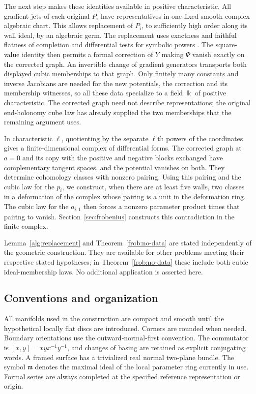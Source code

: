 The next step makes these identities available in positive
characteristic. All gradient jets of each original $P_i$ have
representatives in one fixed smooth complex algebraic chart. This
allows replacement of $P_i$, to sufficiently high order along its wall
ideal, by an algebraic germ. The replacement uses exactness and faithful
flatness of completion \cite[Tags 00MA--00MC]{Stacks} and differential
tests for symbolic powers \cite[Theorem~3.6 and Lemma~2.3]{DSGJ2020}.
The square-value identity then permits a
formal correction of $Y$ making $\Psi$ vanish exactly on the corrected
graph. An invertible change of gradient generators transports both
displayed cubic memberships to that graph. Only finitely many constants
and inverse Jacobians are needed for the new potentials, the correction
and its membership witnesses, so all these data specialize to a field
$\Bbbk$ of positive characteristic. The corrected graph need not describe
representations; the original end-holonomy cube law has already supplied
the two memberships that the remaining argument uses.

In characteristic $\ell$, quotienting by the separate $\ell$th powers
of the coordinates gives a finite-dimensional complex of differential
forms. The corrected graph at $a=0$ and its copy with the positive and
negative blocks exchanged have complementary tangent spaces, and the
potential vanishes on both. They determine cohomology classes with
nonzero pairing. Using this pairing and the cubic law for the $p_i$,
we construct, when there are at least five walls, two classes in a
deformation of the complex whose pairing is a unit in the deformation
ring. The cubic law for the $a_{i,1}$ then forces a nonzero parameter
product times that pairing to vanish. Section~\ref{sec:frobenius}
constructs this contradiction in the finite complex.

Lemma~\ref{alg:replacement} and Theorem~\ref{frob:no-data} are stated independently of the geometric construction. They are available for other problems meeting their respective stated hypotheses; in Theorem~\ref{frob:no-data} these include both cubic ideal-membership laws. No additional application is asserted here.

\subsection{Conventions and organization}
All manifolds used in the construction are compact and smooth until the hypothetical locally flat discs are introduced. Corners are rounded when needed. Boundary orientations use the outward-normal-first convention. The commutator is $[x,y]=xyx^{-1}y^{-1}$, and changes of basing are retained as explicit conjugating words. A framed surface has a trivialized real normal two-plane bundle. The symbol $\mathfrak m$ denotes the maximal ideal of the local parameter ring currently in use. Formal series are always completed at the specified reference representation or origin.

